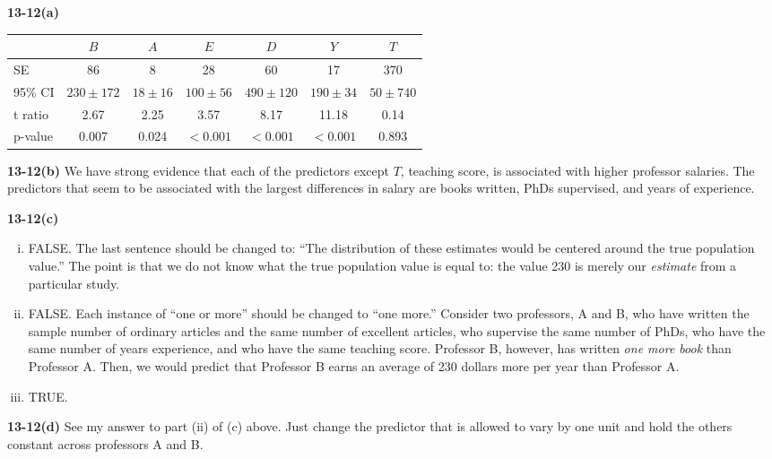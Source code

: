 \documentclass[addpoints,12pt]{exam}\usepackage[]{graphicx}\usepackage[]{color}
\begin{document}
\begin{questions}
\begin{parts}
        \begin{solution} 
        \textbf{13-12(a)}
        \begin{center}
            \begin{tabular}{lcccccc}
              &$B$ & $A$ & $E$& $D$ & $Y$& $T$\\
              \hline
              SE & 86 & 8 & 28 & 60 & 17 & 370\\
              95\% CI & $230 \pm 172$ & $18 \pm 16$ & $100 \pm 56$ & $490 \pm 120$ & $190 \pm 34$ & $50 \pm 740$ \\ 
              t ratio & 2.67&  2.25&  3.57  &8.17 &11.18 &0.14\\
              p-value &0.007& 0.024& $<0.001$& $<0.001$& $<0.001$& 0.893
            \end{tabular}
            \end{center}
        \end{solution}
      \item[]
      \begin{solution} \textbf{13-12(b)}
        We have strong evidence that each of the predictors except $T$, teaching score, is associated with higher professor salaries. The predictors that seem to be associated with the largest differences in salary are books written, PhDs supervised, and years of experience.
      \end{solution}
      \item[]
      \begin{solution} \textbf{13-12(c)}
        \begin{enumerate}[(i)]
          \item FALSE. The last sentence should be changed to: ``The distribution of these estimates would be centered around the true population value.'' The point is that we do not know what the true population value is equal to: the value 230 is merely our \emph{estimate} from a particular study.
          \item FALSE. Each instance of ``one or more'' should be changed to ``one more.'' Consider two professors, A and B, who have written the sample number of ordinary articles and the same number of excellent articles, who supervise the same number of PhDs, who have the same number of years experience, and who have the same teaching score. Professor B, however, has written \emph{one more book} than Professor A. Then, we would predict that Professor B earns an average of 230 dollars more per year than Professor A.
          \item TRUE.
        \end{enumerate}
      \end{solution}
      \item[]
      \begin{solution} \textbf{13-12(d)}
      See my answer to part (ii) of (c) above. Just change the predictor that is allowed to vary by one unit and hold the others constant across professors A and B.\end{solution}
    \end{parts}
\end{questions}
\end{document}
